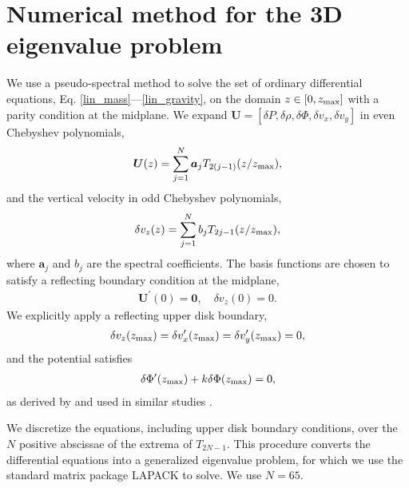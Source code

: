 \section{Numerical method for the 3D eigenvalue problem}
We use a pseudo-spectral method to solve the set of ordinary
differential equations, Eq. \ref{lin_mass}---\ref{lin_gravity}, on 
the domain $ z\in[0,z_\mathrm{max}]$ with a parity condition at the midplane.
We expand $\bm{U}=[\delta P,\delta\rho,\delta\Phi,
  \delta v_x, \delta 
  v_y]$ in even Chebyshev polynomials,
\begin{align}
  \bm{U}(z) = \sum_{j=1}^N \bm{a}_jT_{2(j-1)}(z/z_\mathrm{max}), 
\end{align}
and the vertical velocity in odd Chebyshev polynomials,
\begin{align}
  \delta v_z(z) = \sum_{j=1}^N b_jT_{2j-1}(z/z_\mathrm{max}),   
\end{align}
where $\bm{a}_j$ and $b_j$ are the spectral coefficients. 
The basis functions are chosen to satisfy a reflecting boundary
condition at the midplane, %
\begin{align}
  \bm{U}^\prime(0) = \bm{0}, \quad \delta v_z(0) = 0.
\end{align}
We explicitly apply a reflecting upper disk boundary, 
\begin{align}
  \delta v_z(z_\mathrm{max}) = \delta v_x^\prime(z_\mathrm{max}) = \delta
  v_y^\prime(z_\mathrm{max}) = 0,
\end{align}
and the potential satisfies
\begin{align}
  \delta \Phi^\prime (z_\mathrm{max}) + k \delta\Phi(z_\mathrm{max}) = 0, 
\end{align}
as derived by \cite{goldreich65a} and used in similar studies  
\citep{kim12,lin14c}. %

We discretize the equations, including upper disk boundary conditions,
over the $N$ positive abscissae of the extrema of $T_{2N-1}$. This
procedure converts the differential equations into a generalized
eigenvalue problem, for which we use the standard matrix package
LAPACK to solve. We use $N=65$. 

